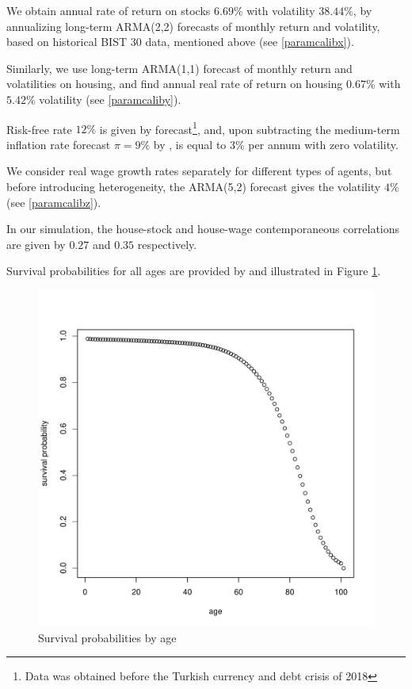 \documentclass[]{elsarticle}
\begin{document}
We obtain annual rate of return on stocks $6.69\%$ with volatility $38.44\%$, by annualizing long-term ARMA(2,2) forecasts of monthly return and volatility, based on historical BIST 30 data, mentioned above (see \ref{paramcalibx}).

Similarly, we use long-term ARMA(1,1) forecast of monthly return and volatilities on housing, and find annual real rate of return on housing $0.67\%$ with $5.42\%$ volatility (see \ref{paramcaliby}).

Risk-free rate $12\%$ is given by \citet{oecd} forecast\footnote{Data was obtained before the Turkish currency and debt crisis of 2018}, and, upon subtracting the medium-term inflation rate forecast $\pi = 9\%$ by \citet{tcmb}, is equal to $3\%$ per annum with zero volatility.

We consider real wage growth rates separately for different types of agents, but before introducing heterogeneity, the ARMA(5,2) forecast gives the volatility $4\%$ (see \ref{paramcalibz}).

In our simulation, the house-stock and house-wage contemporaneous correlations are given by $0.27$ and $0.35$ respectively. 

Survival probabilities for all ages are provided by \citet{tuik2} and illustrated in Figure \ref{fig:surv}.

\begin{figure}[h!]
	\centering
	\includegraphics[scale=0.3]{figs/survival.pdf}
	\caption{Survival probabilities by age}
	\label{fig:surv}
\end{figure}
\end{document}
